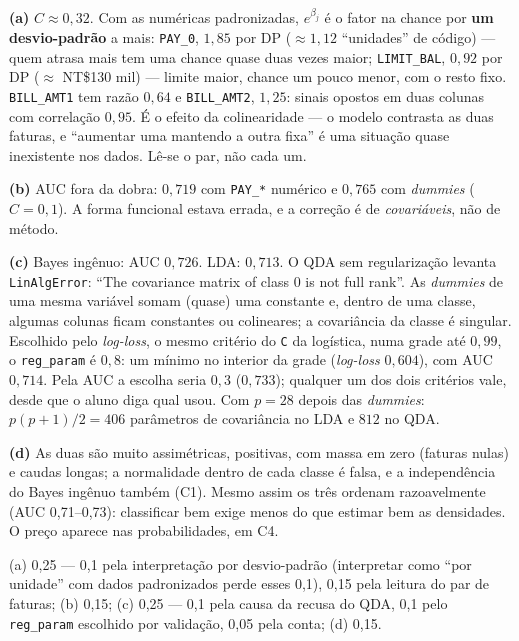 \documentclass[11pt,a4paper]{article}
\newcommand{\cod}[1]{\texttt{#1}}
\begin{document}
\begin{solucao}
\textbf{(a)} $C\approx0{,}32$. Com as numéricas padronizadas, $e^{\beta_j}$ é o fator
na chance por \textbf{um desvio-padrão} a mais: \cod{PAY\_0}, $1{,}85$ por DP
($\approx1{,}12$ ``unidades'' de código) --- quem atrasa mais tem uma chance quase duas
vezes maior; \cod{LIMIT\_BAL}, $0{,}92$ por DP ($\approx$ NT\$130 mil) --- limite maior,
chance um pouco menor, com o resto fixo. \cod{BILL\_AMT1} tem razão $0{,}64$ e
\cod{BILL\_AMT2}, $1{,}25$: sinais opostos em duas colunas com correlação $0{,}95$. É o
efeito da colinearidade --- o modelo contrasta as duas faturas, e ``aumentar uma
mantendo a outra fixa'' é uma situação quase inexistente nos dados. Lê-se o par, não
cada um.

\textbf{(b)} AUC fora da dobra: $0{,}719$ com \cod{PAY\_*} numérico e $0{,}765$ com
\emph{dummies} ($C=0{,}1$). A forma funcional estava errada, e a correção é de
\emph{covariáveis}, não de método.

\textbf{(c)} Bayes ingênuo: AUC $0{,}726$. LDA: $0{,}713$. O QDA sem regularização
levanta \cod{LinAlgError}: ``The covariance matrix of class 0 is not full rank''. As
\emph{dummies} de uma mesma variável somam (quase) uma constante e, dentro de uma
classe, algumas colunas ficam constantes ou colineares; a covariância da classe é
singular. Escolhido pelo \emph{log-loss}, o mesmo critério do \cod{C} da logística,
numa grade até $0{,}99$, o \cod{reg\_param} é $0{,}8$: um mínimo no interior da grade
(\emph{log-loss} $0{,}604$), com AUC $0{,}714$. Pela AUC a escolha seria $0{,}3$
($0{,}733$); qualquer um dos dois critérios vale, desde que o aluno diga qual usou.
Com $p=28$ depois das \emph{dummies}:
$p(p+1)/2=406$ parâmetros de covariância no LDA e $812$ no QDA.

\textbf{(d)} As duas são muito assimétricas, positivas, com massa em zero (faturas
nulas) e caudas longas; a normalidade dentro de cada classe é falsa, e a
independência do Bayes ingênuo também (C1). Mesmo assim os três ordenam razoavelmente
(AUC 0,71--0,73): classificar bem exige menos do que estimar bem as densidades. O
preço aparece nas probabilidades, em C4.
\end{solucao}

\begin{criterio}
(a) 0,25 --- 0,1 pela interpretação por desvio-padrão (interpretar como ``por
unidade'' com dados padronizados perde esses 0,1), 0,15 pela leitura do par de
faturas; (b) 0,15; (c) 0,25 --- 0,1 pela causa da recusa do QDA, 0,1 pelo
\cod{reg\_param} escolhido por validação, 0,05 pela conta; (d) 0,15.
\end{criterio}
\end{document}
